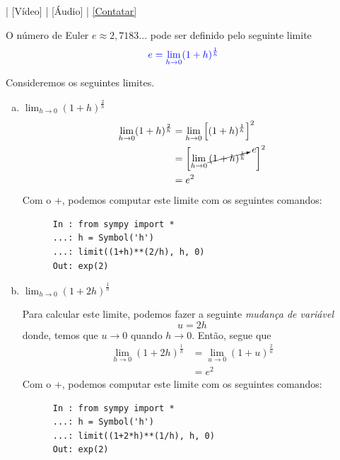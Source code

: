 \begin{flushright}
  [YouTube] | [Vídeo] | [Áudio] | \href{https://phkonzen.github.io/notas/contato.html}{[Contatar]}
\end{flushright}

O número de Euler $e\approx 2,7183...$ pode ser definido pelo seguinte limite
\begin{equation}\label{eq:defe}
  {\color{blue} e = \lim_{h\to 0}(1 + h)^{\frac{1}{h}}}
\end{equation}

\begin{ex}
  Consideremos os seguintes limites.
  \begin{enumerate}[a)]
  \item $\displaystyle\lim_{h\to 0} (1 + h)^{\frac{2}{h}}$
    \begin{align}
      \lim_{h\to 0} (1 + h)^{\frac{2}{h}} &= \lim_{h\to 0} \left[(1 + h)^{\frac{1}{h}}\right]^2\\
                                                     &= \left[\lim_{h\to 0}\cancelto{e}{(1 + h)^{\frac{1}{h}}}\quad\right]^2\\
                                                     &= e^2
    \end{align}
    \ifispython
    Com o {\python}+{\sympy}, podemos computar este limite com os seguintes comandos:
    \begin{lstlisting}
      In : from sympy import *
      ...: h = Symbol('h')
      ...: limit((1+h)**(2/h), h, 0)
      Out: exp(2)
    \end{lstlisting}
    \fi
  \item $\displaystyle \lim_{h\to 0}\left(1 + 2h\right)^{\frac{1}{h}}$
    
    Para calcular este limite, podemos fazer a seguinte \emph{mudança de variável}
    \begin{equation}
      u = 2h
    \end{equation}
    donde, temos que $u\to 0$ quando $h\to 0$. Então, segue que
    \begin{align}
      \lim_{h\to 0}\left(1 + 2h\right)^{\frac{1}{h}} &= \lim_{u\to 0}\left(1 + u\right)^{\frac{2}{u}}\\
                                                     &= e^2
    \end{align}
    \ifispython
    Com o {\python}+{\sympy}, podemos computar este limite com os seguintes comandos:
    \begin{lstlisting}
      In : from sympy import *
      ...: h = Symbol('h')
      ...: limit((1+2*h)**(1/h), h, 0)
      Out: exp(2)
    \end{lstlisting}
    \fi
  \end{enumerate}
\end{ex}

